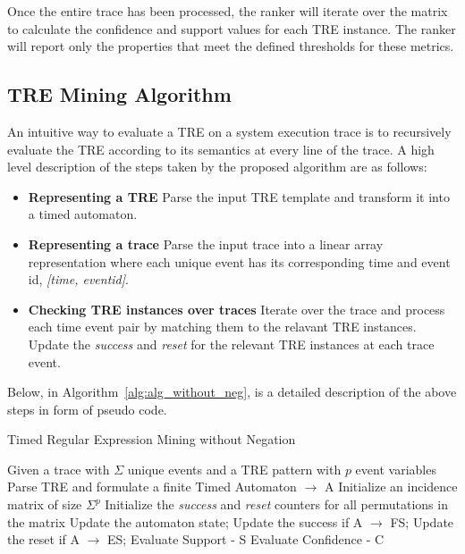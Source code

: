 \documentclass[]{sigplanconf}
\begin{document}
Once the entire trace has been processed, the ranker will iterate over the matrix to calculate the confidence and support values for each TRE instance. The ranker will report only the properties that meet the defined thresholds for these metrics.

\subsection{TRE Mining Algorithm}

An intuitive way to evaluate a TRE on a system execution trace is to recursively evaluate the TRE according to its semantics at every line of the trace. A high level description of the steps taken by the proposed algorithm are as follows:

\begin{itemize}
\item \textbf{Representing a TRE} Parse the input TRE template and transform it into a timed automaton.
\item \textbf{Representing a trace} Parse the input trace into a linear array representation where each unique event has its corresponding time and event id, \emph{[time, eventid]}.
\item \textbf{Checking TRE instances over traces} Iterate over the trace and process each time event pair by matching them to the relavant TRE instances. Update the \emph{success} and \emph{reset} for the relevant TRE instances at each trace event.
\end{itemize}

Below, in Algorithm~\ref{alg:alg_without_neg}, is a detailed description of the above steps in form of pseudo code.

\begin{algorithm}[h]
    \caption{Timed Regular Expression Mining without Negation}
    \begin{algorithmic}[1]
     \Require  Given a trace with $\Sigma$ unique events and a TRE pattern with $p$ event variables
     \Ensure Parse TRE and formulate a finite Timed Automaton $\rightarrow$ A
     \State Initialize an incidence matrix of size $\Sigma^p$
     \State Initialize the \emph{success} and \emph{reset} counters for all permutations in the matrix
        \State Update the automaton state;
        \State Update the success if A $\rightarrow$ FS;
        \State Update the reset if A $\rightarrow$ ES;
     \EndFor
     \EndFor
     \State Evaluate Support - S
     \State Evaluate Confidence - C
    \end{algorithmic}
\label{alg:alg_without_neg}
\end{algorithm}
\end{document}
